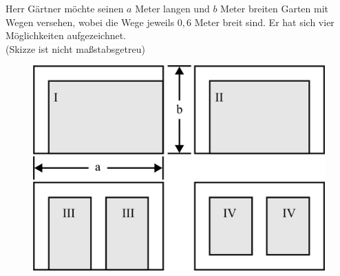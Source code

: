 \documentclass[a4paper,12pt]{article}
\begin{document}
\begin{minipage}[t]{0.55\textwidth}
  Herr Gärtner möchte seinen $a$ Meter langen und $b$ Meter breiten Garten mit Wegen versehen, wobei die Wege jeweils $0,6$ Meter breit sind. Er hat sich vier Möglichkeiten aufgezeichnet. \\
  (Skizze ist nicht maßstabsgetreu)
\end{minipage}
\hspace*{0.75cm}
\begin{minipage}[t]{0.40\textwidth}
  \begin{figure}[H]
    \vspace{-1cm}
    \centering
    \includegraphics[width=1\linewidth]{7G_2SA_image2.png}
  \end{figure}
\end{minipage}
\end{document}
